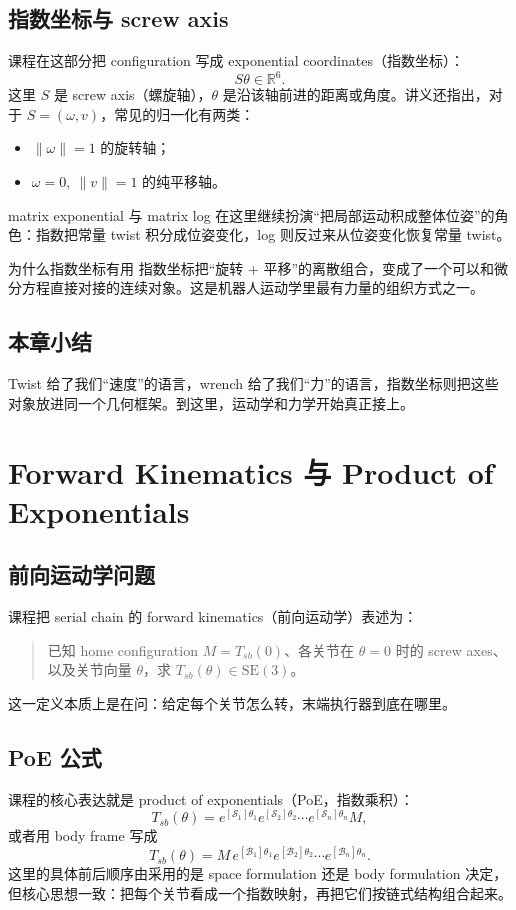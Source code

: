 \documentclass[a4paper]{article}
\begin{document}
\subsection{指数坐标与 screw axis}
课程在这部分把 configuration 写成 exponential coordinates（指数坐标）：
\[
S\theta \in \mathbb{R}^6.
\]
这里 \(S\) 是 screw axis（螺旋轴），\(\theta\) 是沿该轴前进的距离或角度。讲义还指出，对于 \(S=(\omega,v)\)，常见的归一化有两类：
\begin{itemize}
    \item \(\|\omega\|=1\) 的旋转轴；
    \item \(\omega=0,\ \|v\|=1\) 的纯平移轴。
\end{itemize}
matrix exponential 与 matrix log 在这里继续扮演“把局部运动积成整体位姿”的角色：指数把常量 twist 积分成位姿变化，log 则反过来从位姿变化恢复常量 twist。

\begin{knowledgebox}{为什么指数坐标有用}
指数坐标把“旋转 + 平移”的离散组合，变成了一个可以和微分方程直接对接的连续对象。这是机器人运动学里最有力量的组织方式之一。
\end{knowledgebox}

\subsection{本章小结}
Twist 给了我们“速度”的语言，wrench 给了我们“力”的语言，指数坐标则把这些对象放进同一个几何框架。到这里，运动学和力学开始真正接上。

\section{Forward Kinematics 与 Product of Exponentials}
\subsection{前向运动学问题}
课程把 serial chain 的 forward kinematics（前向运动学）表述为：
\begin{quote}
已知 home configuration \(M=T_{sb}(0)\)、各关节在 \(\theta=0\) 时的 screw axes、以及关节向量 \(\theta\)，求 \(T_{sb}(\theta)\in\mathrm{SE}(3)\)。
\end{quote}
这一定义本质上是在问：给定每个关节怎么转，末端执行器到底在哪里。

\subsection{PoE 公式}
课程的核心表达就是 product of exponentials（PoE，指数乘积）：
\[
T_{sb}(\theta)=e^{[\mathcal S_1]\theta_1}e^{[\mathcal S_2]\theta_2}\cdots e^{[\mathcal S_n]\theta_n}M,
\]
或者用 body frame 写成
\[
T_{sb}(\theta)=M\,e^{[\mathcal B_1]\theta_1}e^{[\mathcal B_2]\theta_2}\cdots e^{[\mathcal B_n]\theta_n}.
\]
这里的具体前后顺序由采用的是 space formulation 还是 body formulation 决定，但核心思想一致：把每个关节看成一个指数映射，再把它们按链式结构组合起来。
\end{document}
